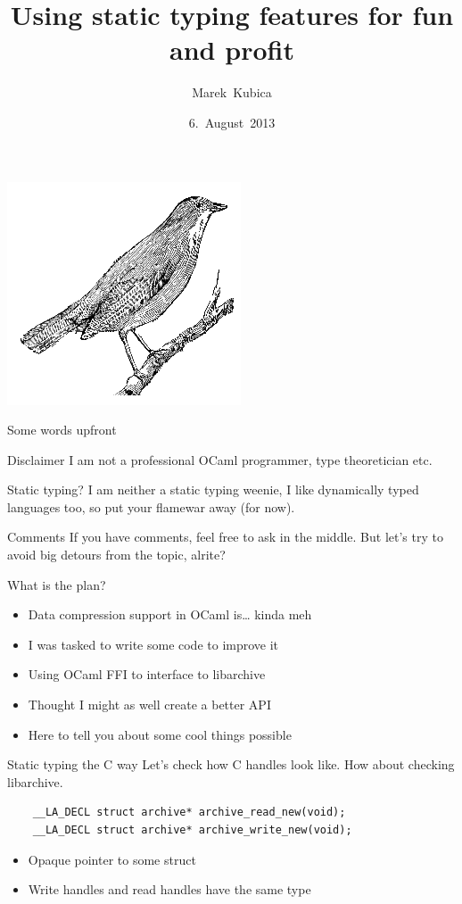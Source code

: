 \documentclass{beamer}
\title{Using static typing features for fun and profit}
\author{Marek~Kubica}
\date{6.~August~2013}
\institute{Lambda Munich}
\begin{document}
{
\usebackgroundtemplate%
{%
    \includegraphics[width=\paperwidth,height=\paperheight]{nightingdale}%
}
\frame{
  \titlepage
}
}


\begin{frame}{Some words upfront}
  \begin{alertblock}{Disclaimer}
    I am not a professional OCaml programmer, type theoretician etc.
  \end{alertblock}
  \pause
  \begin{alertblock}{Static typing?}
    I am neither a static typing weenie, I like dynamically typed languages
    too, so put your flamewar away (for now).
  \end{alertblock}
  \begin{exampleblock}{Comments}
    If you have comments, feel free to ask in the middle. But let's try to
    avoid big detours from the topic, alrite?
  \end{exampleblock}
\end{frame}

\begin{frame}{What is the plan?}
  \begin{itemize}
    \item Data compression support in OCaml is… kinda meh
    \item I was tasked to write some code to improve it
    \item Using OCaml FFI to interface to libarchive
    \item Thought I might as well create a better API
    \item Here to tell you about some cool things possible
  \end{itemize}
\end{frame}

\begin{frame}[fragile]{Static typing the C way}
  Let's check how C handles look like. How about checking libarchive.
  \begin{verbatim}
    __LA_DECL struct archive* archive_read_new(void);
    __LA_DECL struct archive* archive_write_new(void);
  \end{verbatim}
  \begin{itemize}
    \item Opaque pointer to some struct
    \item Write handles and read handles have the same type
  \end{itemize}
\end{frame}
\end{document}
